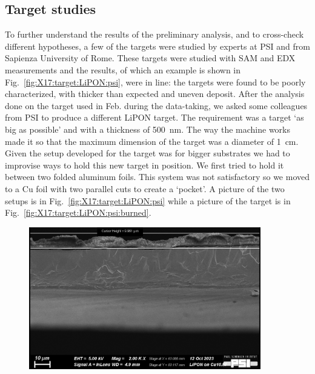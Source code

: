 \begin{refsection}
    \section{Target studies}
    \label{sec:X17:targets}
        To further understand the results of the preliminary analysis, and to cross-check different hypotheses, a few of the targets were studied by experts at PSI and from Sapienza University of Rome.
        These targets were studied with SAM and EDX measurements and the results, of which an example is shown in Fig.~\ref{fig:X17:target:LiPON:psi}, were in line: the targets were found to be poorly characterized, with thicker than expected and uneven deposit.
        After the analysis done on the target used in Feb. during the data-taking, we asked some colleagues from PSI to produce a different LiPON target.
        The requirement was a target `as big as possible' and with a thickness of \SI{500}{\nano m}.
        The way the machine works made it so that the maximum dimension of the target was a diameter of \SI{1}{cm}.
        Given the setup developed for the target was for bigger substrates we had to improvise ways to hold this new target in position.
        We first tried to hold it between two folded aluminum foils. 
        This system was not satisfactory so we moved to a Cu foil with two parallel cuts to create a `pocket'.
        A picture of the two setups is in Fig.~\ref{fig:X17:target:LiPON:psi} while a picture of the target  is in Fig.~\ref{fig:X17:target:LiPON:psi:burned}.
        \begin{figure}
            \centering
            \includegraphics[width = 0.9\textwidth]{Figures/X17/PSI_LiPON_picture.png}

\end{figure}
\end{refsection}
